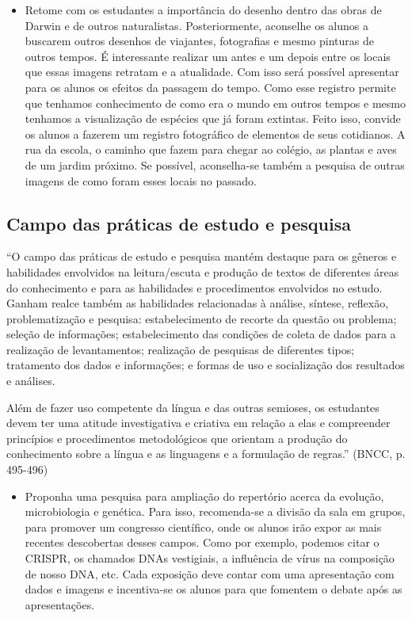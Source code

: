 \documentclass[12pt]{extarticle}
\begin{document}
\begin{itemize}
\item
  Retome com os estudantes a importância do desenho dentro das obras de
  Darwin e de outros naturalistas. Posteriormente, aconselhe os alunos a
  buscarem outros desenhos de viajantes, fotografias e mesmo pinturas de
  outros tempos. É interessante realizar um antes e um depois entre os
  locais que essas imagens retratam e a atualidade. Com isso será
  possível apresentar para os alunos os efeitos da passagem do tempo.
  Como esse registro permite que tenhamos conhecimento de como era o
  mundo em outros tempos e mesmo tenhamos a visualização de espécies que
  já foram extintas. Feito isso, convide os alunos a fazerem um registro
  fotográfico de elementos de seus cotidianos. A rua da escola, o
  caminho que fazem para chegar ao colégio, as plantas e aves de um
  jardim próximo. Se possível, aconselha-se também a pesquisa de outras
  imagens de como foram esses locais no passado.
\end{itemize}

\subsection{Campo das práticas de estudo e pesquisa}

``O campo das práticas de estudo e pesquisa mantém destaque para os
gêneros e habilidades envolvidos na leitura/escuta e produção de textos
de diferentes áreas do conhecimento e para as habilidades e
procedimentos envolvidos no estudo. Ganham realce também as habilidades
relacionadas à análise, síntese, reflexão, problematização e pesquisa:
estabelecimento de recorte da questão ou problema; seleção de
informações; estabelecimento das condições de coleta de dados para a
realização de levantamentos; realização de pesquisas de diferentes
tipos; tratamento dos dados e informações; e formas de uso e
socialização dos resultados e análises.

Além de fazer uso competente da língua e das outras semioses, os
estudantes devem ter uma atitude investigativa e criativa em relação a
elas e compreender princípios e procedimentos metodológicos que orientam
a produção do conhecimento sobre a língua e as linguagens e a formulação
de regras.'' (BNCC, p. 495-496)

\begin{itemize}
\item
  Proponha uma pesquisa para ampliação do repertório acerca da evolução,
  microbiologia e genética. Para isso, recomenda-se a divisão da sala em
  grupos, para promover um congresso científico, onde os alunos irão
  expor as mais recentes descobertas desses campos. Como por exemplo,
  podemos citar o CRISPR, os chamados DNAs vestigiais, a influência de
  vírus na composição de nosso DNA, etc. Cada exposição deve contar com
  uma apresentação com dados e imagens e incentiva-se os alunos para que
  fomentem o debate após as apresentações.
\end{itemize}
\end{document}
